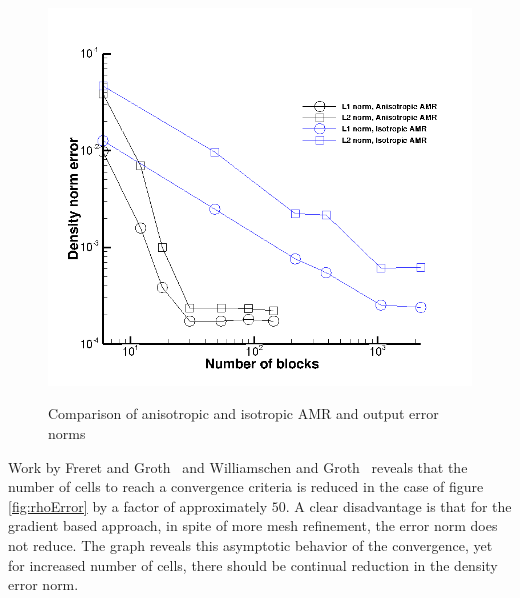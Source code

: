 \begin{figure}[t!]
{   \includegraphics[width=0.2\textheight, trim=0cm 0cm 0 0cm,clip=true]{./figs/outflowError.png}}%
   \caption{Comparison of anisotropic and isotropic AMR and output error norms}  
   \label{fig:Gradientbased}
\end{figure}  


Work by Freret and Groth~\cite{Freret:2015} and Williamschen and Groth~\cite{Williamschen:2013} reveals that the number of cells to reach a convergence criteria is reduced in the case of figure \ref{fig:rhoError} by a factor of approximately $50$. A clear disadvantage is that for the gradient based approach, in spite of more mesh refinement, the error norm does not reduce. The graph reveals this asymptotic behavior of the convergence, yet for increased number of cells, there should be continual reduction in the density error norm.
